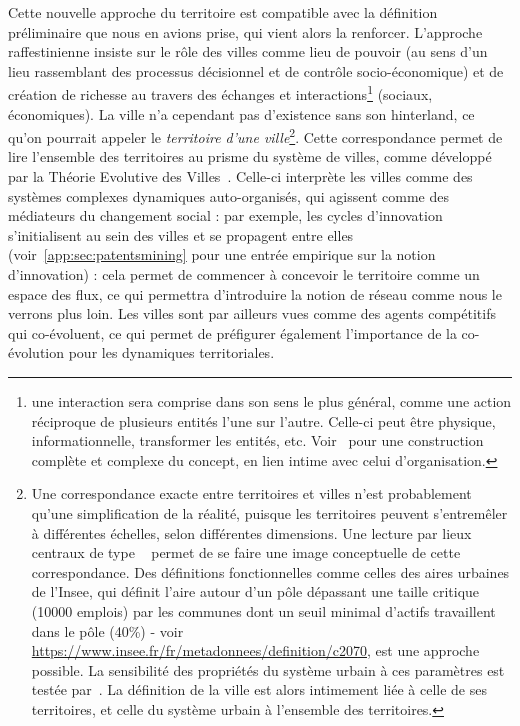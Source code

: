 {Cette nouvelle approche du territoire est compatible avec la définition préliminaire que nous en avions prise, qui vient alors la renforcer. L'approche raffestinienne insiste sur le rôle des villes comme lieu de pouvoir (au sens d'un lieu rassemblant des processus décisionnel et de contrôle socio-économique) et de création de richesse au travers des échanges et interactions\footnote{une interaction sera comprise dans son sens le plus général, comme une action réciproque de plusieurs entités l'une sur l'autre. Celle-ci peut être physique, informationnelle, transformer les entités, etc. Voir~\cite{morin1976methode} pour une construction complète et complexe du concept, en lien intime avec celui d'organisation.} (sociaux, économiques). La ville n'a cependant pas d'existence sans son hinterland, ce qu'on pourrait appeler le \emph{territoire d'une ville}\footnote{Une correspondance exacte entre territoires et villes n'est probablement qu'une simplification de la réalité, puisque les territoires peuvent s'entremêler à différentes échelles, selon différentes dimensions. Une lecture par lieux centraux de type ~\cite{banos2011christaller} permet de se faire une image conceptuelle de cette correspondance. Des définitions fonctionnelles comme celles des aires urbaines de l'Insee, qui définit l'aire autour d'un pôle dépassant une taille critique (10000 emplois) par les communes dont un seuil minimal d'actifs travaillent dans le pôle (40\%) - voir \url{https://www.insee.fr/fr/metadonnees/definition/c2070}, est une approche possible. La sensibilité des propriétés du système urbain à ces paramètres est testée par~\cite{2015arXiv150707878C}. La définition de la ville est alors intimement liée à celle de ses territoires, et celle du système urbain à l'ensemble des territoires.}. Cette correspondance permet de lire l'ensemble des territoires au prisme du système de villes, comme développé par la Théorie Evolutive des Villes~\cite{pumain2010theorie}. Celle-ci interprète les villes comme des systèmes complexes dynamiques auto-organisés, qui agissent comme des médiateurs du changement social : par exemple, les cycles d'innovation s'initialisent au sein des villes et se propagent entre elles (voir~\ref{app:sec:patentsmining} pour une entrée empirique sur la notion d'innovation) : cela permet de commencer à concevoir le territoire comme un espace des flux, ce qui permettra d'introduire la notion de réseau comme nous le verrons plus loin. Les villes sont par ailleurs vues comme des agents compétitifs qui co-évoluent, ce qui permet de préfigurer également l'importance de la co-évolution pour les dynamiques territoriales.
}



